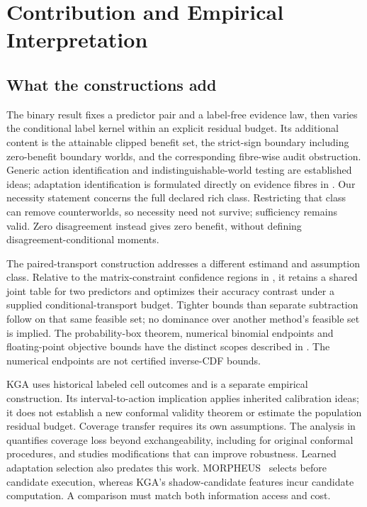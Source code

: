 \section{Contribution and Empirical Interpretation}
\label{app:journal-empirical}

\subsection{What the constructions add}
The binary result fixes a predictor pair and a label-free evidence law, then
varies the conditional label kernel within an explicit residual budget. Its
additional content is the attainable clipped benefit set, the strict-sign
boundary including zero-benefit boundary worlds, and the corresponding
fibre-wise audit obstruction. Generic action identification and
indistinguishable-world testing are established ideas; adaptation identification is
formulated directly on evidence fibres in \cite{jhawar2026identifiable}.
Our necessity statement concerns the full declared rich
class. Restricting that class can remove counterworlds, so necessity need not
survive; sufficiency remains valid. Zero disagreement instead gives zero
benefit, without defining disagreement-conditional moments.

The paired-transport construction addresses a different estimand and
assumption class. Relative to the matrix-constraint confidence regions in
\cite{li2026matrixconstraints}, it retains a shared joint table
for two predictors and optimizes their accuracy contrast under a supplied
conditional-transport budget. Tighter bounds than separate subtraction follow
on that same feasible set; no dominance over another method's feasible set is
implied. The probability-box theorem, numerical binomial endpoints and
floating-point objective bounds have the distinct scopes described in
.
The numerical endpoints are not certified inverse-CDF bounds.

KGA uses historical labeled cell outcomes and is a separate empirical
construction. Its interval-to-action implication applies inherited calibration
ideas; it does not establish a new conformal validity theorem or estimate the
population residual budget. Coverage transfer requires its own assumptions.
The analysis in \cite{barber2023beyond} quantifies coverage loss beyond
exchangeability, including for original conformal procedures, and studies
modifications that can improve robustness. Learned adaptation selection also
predates this work. MORPHEUS~\cite{danilowski2026morpheus} selects before candidate
execution, whereas KGA's shadow-candidate features incur candidate computation.
A comparison must match both information access and cost.

